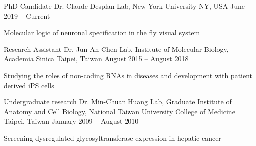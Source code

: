 


  \cventry
    {PhD Candidate} %
    {Dr. Claude Desplan Lab, New York University} %
    {NY, USA} %
    {June 2019 -- Current} %
    {
      \begin{cvitems} %
        \item {Molecular logic of neuronal specification in the fly visual system}
      \end{cvitems}
    }

  \cventry
    {Research Assistant} %
    {Dr. Jun-An Chen Lab, Institute of Molecular Biology, Academia Sinica} %
    {Taipei, Taiwan} %
    {August 2015 -- August 2018} %
    {
      \begin{cvitems} %
        \item {Studying the roles of non-coding RNAs in diseases and development with patient derived iPS cells}
      \end{cvitems}
    }
    
  \cventry
    {Undergraduate research} %
    {Dr. Min-Chuan Huang Lab, Graduate Institute of Anatomy and Cell Biology, National Taiwan University College of Medicine} %
    {Taipei, Taiwan} %
    {January 2009 -- August 2010} %
    {
      \begin{cvitems} %
        \item {Screening dysregulated glycosyltransferase expression in hepatic cancer}
      \end{cvitems}
    }
    
